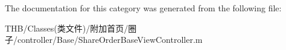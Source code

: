The documentation for this category was generated from the following file\+:\begin{DoxyCompactItemize}
\item 
T\+H\+B/\+Classes(类文件)/附加首页/圈子/controller/\+Base/Share\+Order\+Base\+View\+Controller.\+m\end{DoxyCompactItemize}
